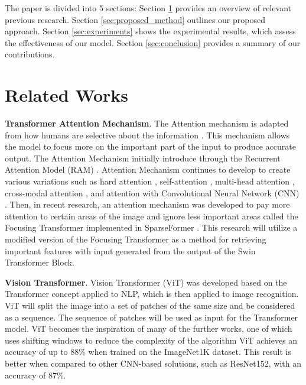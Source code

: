 \documentclass[runningheads]{llncs}
\begin{document}
The paper is divided into 5 sections: Section \ref{sec:related_works} provides an overview of relevant previous research. Section \ref{sec:proposed_method} outlines our proposed approach. Section \ref{sec:experiments} shows the experimental results, which assess the effectiveness of our model. Section \ref{sec:conclusion} provides a summary of our contributions.

\section{Related Works}
\label{sec:related_works}

\textbf{Transformer Attention Mechanism}. The Attention mechanism is adapted from how humans are selective about the information \cite{gong2022swin}. This mechanism allows the model to focus more on the important part of the input to produce accurate output. The Attention Mechanism initially introduce through the Recurrent Attention Model (RAM) \cite{mnih2014recurrent}. Attention Mechanism continues to develop to create various variations such as hard attention \cite{xu2015show}, self-attention \cite{vaswani2017attention}, multi-head attention \cite{vaswani2017attention}, cross-modal attention \cite{lu2018neural}, and attention with Convolutional Neural Network (CNN) \cite{woo2018cbam}. Then, in recent research, an attention mechanism was developed to pay more attention to certain areas of the image and ignore less important areas called the Focusing Transformer implemented in SparseFormer \cite{gao2023sparseformer}. This research will utilize a modified version of the Focusing Transformer as a method for retrieving important features with input generated from the output of the Swin Transformer Block.

\textbf{Vision Transformer}. Vision Transformer (ViT) \cite{dosovitskiy2020image} was developed based on the Transformer concept applied to NLP, which is then applied to image recognition. ViT will split the image into a set of patches of the same size and be considered as a sequence. The sequence of patches will be used as input for the Transformer model. ViT becomes the inspiration of many of the further works, one of which uses shifting windows to reduce the complexity of the algorithm \cite{gong2022swin} ViT achieves an accuracy of up to 88\% when trained on the ImageNet1K dataset. This result is better when compared to other CNN-based solutions, such as ResNet152, with an accuracy of 87\%.
\end{document}
